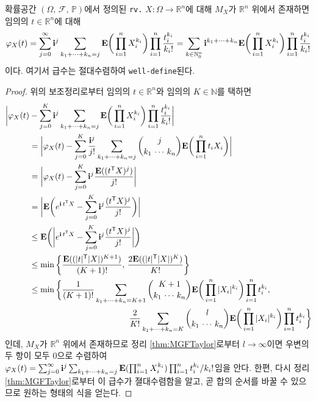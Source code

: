 \begin{theorem}\label{thm:CFTaylor}
    확률공간 $(\Omega,\,\mathcal{F},\,\mathbb{P})$에서 정의된 \texttt{rv.} $X:\Omega\to\mathbb{R}^n$에 대해 $M_X$가 $\mathbb{R}^n$ 위에서 존재하면 임의의 $t\in\mathbb{R}^n$에 대해
    \begin{equation*}
        \varphi_X(t)=\sum_{j=0}^\infty\mathbf{i}^j\sum_{k_1+\cdots+k_n=j}\mathbf{E}\bigg(\prod_{i=1}^nX_i^{k_i}\bigg)\prod_{i=1}^n\frac{t_i^{k_i}}{k_i!}=\sum_{k\in\mathbb{N}_0^n}\mathbf{i}^{k_1+\cdots+k_n}\mathbf{E}\bigg(\prod_{i=1}^nX_i^{k_i}\bigg)\prod_{i=1}^n\frac{t_i^{k_i}}{k_i!}
    \end{equation*}
    이다. 여기서 급수는 절대수렴하여 \texttt{well-define}된다.
\end{theorem}

\begin{proof}
    위의 보조정리로부터 임의의 $t\in\mathbb{R}^n$와 임의의 $K\in\mathbb{N}$를 택하면
    \begin{align*}
        \bigg|\varphi_X(t)&-\sum_{j=0}^K\mathbf{i}^j\sum_{k_1+\cdots+k_n=j}\mathbf{E}\bigg(\prod_{i=1}^nX_i^{k_i}\bigg)\prod_{i=1}^n\frac{t_i^{k_i}}{k_i!}\bigg|\\
        &=\bigg|\varphi_X(t)-\sum_{j=0}^K\frac{\mathbf{i}^j}{j!}\sum_{k_1+\cdots+k_n=j}\binom{j}{k_1\,\cdots\,k_n}\mathbf{E}\bigg(\prod_{i=1}^nt_iX_i\bigg)\bigg|\\
        &=\bigg|\varphi_X(t)-\sum_{j=0}^K\mathbf{i}^j\frac{\mathbf{E}((t^{\mathsf{T}} X)^j)}{j!}\bigg|\\
        &=\bigg|\mathbf{E}\bigg(e^{\mathbf{i}\,t^{\mathsf{T}} X}-\sum_{j=0}^K\mathbf{i}^j\frac{(t^{\mathsf{T}} X)^j}{j!}\bigg)\bigg|\\
        &\leq\mathbf{E}\bigg(\bigg|e^{\mathbf{i}\,t^{\mathsf{T}} X}-\sum_{j=0}^K\mathbf{i}^j\frac{(t^{\mathsf{T}} X)^j}{j!}\bigg|\bigg)\\
        &\leq\min\bigg\{\frac{\mathbf{E}((|t|^{\mathsf{T}}|X|)^{K+1})}{(K+1)!},\,\frac{2\mathbf{E}((|t|^{\mathsf{T}}|X|)^K)}{K!}\bigg\}\\
        &\leq\min\bigg\{\frac{1}{(K+1)!}\sum_{k_1+\cdots+k_n=K+1}\binom{K+1}{k_1\,\cdots\,k_n}\mathbf{E}\bigg(\prod_{i=1}^n|X_i|^{k_i}\bigg)\prod_{i=1}^nt_i^{k_i},\\
        &\qquad\qquad\qquad\qquad\qquad\qquad\frac{2}{K!}\sum_{k_1+\cdots+k_n=K}\binom{l}{k_1\,\cdots\,k_n}\mathbf{E}\bigg(\prod_{i=1}^n|X_i|^{k_i}\bigg)\prod_{i=1}^nt_i^{k_i}\bigg\}
    \end{align*}
    인데, $M_X$가 $\mathbb{R}^n$ 위에서 존재하므로 정리 \ref{thm:MGFTaylor}로부터 $l\to\infty$이면 우변의 두 항이 모두 $0$으로 수렴하여 $\varphi_X(t)=\sum_{j=0}^\infty\mathbf{i}^j\sum_{k_1+\cdots+k_n=j}\mathbf{E}(\prod_{i=1}^nX_i^{k_i})\prod_{i=1}^nt_i^{k_i}/k_i!$임을 안다. 한편, 다시 정리 \ref{thm:MGFTaylor}로부터 이 급수가 졀대수렴함을 알고, 곧 합의 순서를 바꿀 수 있으므로 원하는 형태의 식을 얻는다.
\end{proof}

